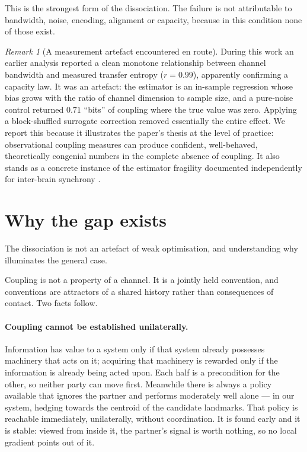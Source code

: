\documentclass[11pt,a4paper]{article}
\theoremstyle{plain}
\theoremstyle{definition}
\theoremstyle{remark}
\newtheorem{remark}[remark]{Remark}
\begin{document}
This is the strongest form of the dissociation. The failure is not attributable to bandwidth, noise,
encoding, alignment or capacity, because in this condition none of those exist.

\begin{remark}[A measurement artefact encountered en route]\label{rem:artefact}
During this work an earlier analysis reported a clean monotone relationship between channel
bandwidth and measured transfer entropy ($r = 0.99$), apparently confirming a capacity law. It was
an artefact: the estimator is an in-sample regression whose bias grows with the ratio of channel
dimension to sample size, and a pure-noise control returned $0.71$ ``bits'' of coupling where the
true value was zero. Applying a block-shuffled surrogate correction removed essentially the entire
effect. We report this because it illustrates the paper's thesis at the level of practice:
observational coupling measures can produce confident, well-behaved, theoretically congenial numbers
in the complete absence of coupling. It also stands as a concrete instance of the estimator
fragility documented independently for inter-brain synchrony
\citep{zimmermann2025arbitrary}.
\end{remark}

\section{Why the gap exists}\label{sec:why}

The dissociation is not an artefact of weak optimisation, and understanding why illuminates the
general case.

Coupling is not a property of a channel. It is a jointly held convention, and conventions are
attractors of a shared history rather than consequences of contact. Two facts follow.

\paragraph{Coupling cannot be established unilaterally.}
Information has value to a system only if that system already possesses machinery that acts on it;
acquiring that machinery is rewarded only if the information is already being acted upon. Each half
is a precondition for the other, so neither party can move first. Meanwhile there is always a policy
available that ignores the partner and performs moderately well alone --- in our system, hedging
towards the centroid of the candidate landmarks. That policy is reachable immediately, unilaterally,
without coordination. It is found early and it is stable: viewed from inside it, the partner's signal
is worth nothing, so no local gradient points out of it.
\end{document}
